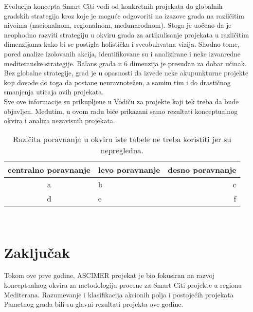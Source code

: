 \documentclass[a4paper,12pt]{article}
\begin{document}
{Evolucija koncepta Smart Citi vodi od konkretnih projekata do globalnih gradskih strategija kroz koje je moguće odgovoriti na izazove grada na različitim nivoima (nacionalnom, regionalnom, međunarodnom). Stoga je uočeno da je neophodno razviti strategiju u okviru grada za artikulisanje projekata u različitim dimenzijama kako bi se postigla holistička i sveobuhvatna vizija. Shodno tome, pored analize izolovanih akcija, identifikovane su i analizirane i neke izvanredne mediteranske strategije. Balans grada u 6 dimenzija je presudan za dobar učinak. Bez globalne strategije, grad je u opasnosti da izvede neke akupunkturne projekte koji dovode do toga da postane neuravnotežen, a samim tim i do drastičnog smanjenja uticaja ovih projekata. \\

Sve ove informacije su prikupljene u Vodiču za projekte koji tek treba da bude objavljen. Međutim, u ovom radu biće prikazani samo rezultati konceptualnog okvira i analiza nezavisnih projekata.\\



\begin{table}[h!]
\begin{center}
\caption{Razlčita poravnanja u okviru iste tabele ne treba koristiti jer su nepregledna.}
\begin{tabular}{|c|l|r|} \hline
centralno poravnanje& levo poravnanje& desno poravnanje\\ \hline
a &b&c\\ \hline
d &e&f\\ \hline
\end{tabular}
\label{tab:tabela1}
\end{center}
\end{table}

\\


\appendix
\section{Zaključak}
\label{sec:zakljucak}
Tokom ove prve godine, ASCIMER projekat je bio fokusiran na razvoj konceptualnog okvira za metodologiju procene za Smart Citi projekte u regionu Mediterana. Razumevanje i klasifikacija akcionih polja i postojećih projekata Pametnog grada bili su glavni rezultati projekta ove godine. \\

}
\end{document}
